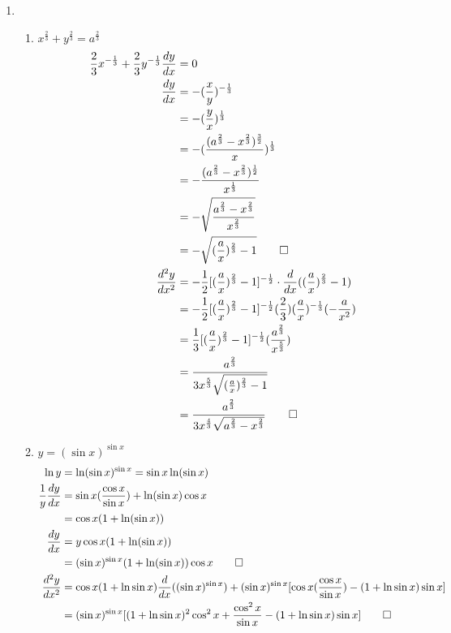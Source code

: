 \documentclass[12pt, a4paper]{article}
\begin{document}
\begin{enumerate}[Q\arabic*.]
  \item 
    \begin{enumerate}[(\alph*)]
      \item $\displaystyle x^\frac{2}{3} + y^\frac{2}{3} = a^\frac{2}{3}$
        \begin{align*}
          \frac{2}{3}x^{-\frac{1}{3}} + \frac{2}{3}y^{-\frac{1}{3}}\frac{dy}{dx} &= 0 \\
          \frac{dy}{dx} &= -(\frac{x}{y})^{-\frac{1}{3}} \\
                        &= -(\frac{y}{x})^{\frac{1}{3}} \\
                        &= -(\frac{(a^\frac{2}{3} - x^\frac{2}{3})^\frac{3}{2}}{x})^\frac{1}{3} \\
                        &= -\frac{(a^\frac{2}{3}-x^\frac{2}{3})^\frac{1}{2}}{x^\frac{1}{3}} \\
                        &= -\sqrt{\frac{a ^\frac{2}{3} - x^ \frac{2}{3}}{x^\frac{2}{3}}} \\
                        &= -\sqrt{(\frac{a}{x})^\frac{2}{3} - 1} \qed \\
          \frac{d^2y}{dx^2} &= -\frac{1}{2}[(\frac{a}{x})^\frac{2}{3}-1]^{-\frac{1}{2}} \cdot \frac{d}{dx}((\frac{a}{x})^\frac{2}{3}-1) \\
                            &= -\frac{1}{2}[(\frac{a}{x})^\frac{2}{3}-1]^{-\frac{1}{2}} (\frac{2}{3})(\frac{a}{x})^{-\frac{1}{3}}(-\frac{a}{x^2}) \\
                            &= \frac{1}{3}[(\frac{a}{x})^\frac{2}{3}-1]^{-\frac{1}{2}}(\frac{a^{\frac{2}{3}}}{x^{\frac{5}{3}}}) \\
                            &= \frac{a^\frac{2}{3}}{3x^{\frac{5}{3}}\sqrt{(\frac{a}{x})^\frac{2}{3}-1}} \\
                            &= \frac{a^\frac{2}{3}}{3x^{\frac{4}{3}}\sqrt{a^\frac{2}{3}-x^\frac{2}{3}}} \qed\\
        \end{align*}

      \item $\displaystyle y=(\sin x)^{\sin x}$ \\
        \begin{align*}
          \ln y &= \ln(\sin x)^{\sin x} = \sin x\ln(\sin x)\\
          \frac{1}{y}\frac{dy}{dx} &= \sin x(\frac{\cos x}{\sin x}) + \ln(\sin x)\cos x \\
                                   &= \cos x(1 + \ln(\sin x))\\
          \frac{dy}{dx} &= y\cos x(1 + \ln(\sin x)) \\
                        &= (\sin x)^{\sin x}(1+\ln(\sin x))\cos x \qed \\
          \frac{d^2y}{dx^2} &= \cos x(1 + \ln\sin x)\frac{d}{dx}((\sin x)^{\sin x}) + (\sin x)^{\sin x}[\cos x(\frac{\cos x}{\sin x}) - (1 + \ln\sin x)\sin x] \\
                            &= (\sin x)^{\sin x}[(1 + \ln\sin x)^2\cos^2 x + \frac{\cos^2x}{\sin x} - (1 + \ln\sin x)\sin x] \qed
        \end{align*}


\end{enumerate}
\end{enumerate}
\end{document}
